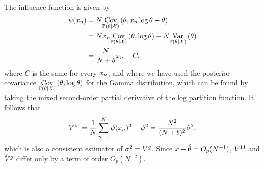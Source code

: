 The influence function is given by
%
\begin{align*}
%
\infl(\x_n) ={}& N \cov{\post}{\theta, x_n \log \theta - \theta}\\
 ={}& N x_n \cov{\post}{\theta, \log \theta} - N \var{\post}{\theta} \\
 ={}& \frac{N}{N + b} x_n + C.
%
\end{align*}
%
where $C$ is the same for every $x_n$, and where we have used the posterior
covariance $\underset{\mathbb{P}(\theta | {\mathcal{X}})}{\mathrm{Cov}}\left(\theta, \log \theta\right)$ for the Gamma distribution, which
can be found by taking the mixed second-order partial derivative of the log
partition function.  It follows that
%
\begin{align*}
%
\gcovij = \meann \infl(\x_n)^2 - \bar{\infl}^2
    = \frac{N^2}{(N + b)^2} \hat\sigma^2,
%
\end{align*}
%
which is also a consistent estimator of $\sigma^2 = V^g$.  Since $\bar{x} -
\hat\theta = O_p(N^{-1})$, $V^{\mathrm{IJ}}$ and $\hat{V}^{g}$ differ only by a term of
order $O_p(N^{-2})$.
